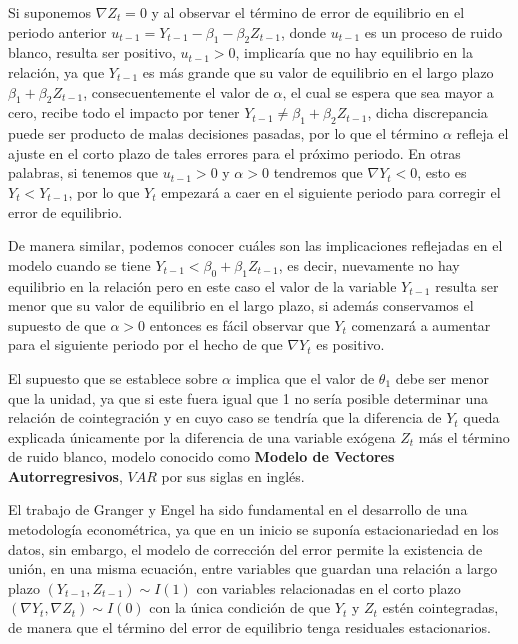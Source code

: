 Si suponemos $ \nabla Z_t =0$  y al observar el término de error de equilibrio en el periodo anterior $u_{t-1}=Y_{t-1} - \beta_1  -\beta_2 Z_{t-1} $, donde $u_{t-1}$ es un proceso de ruido blanco, resulta ser positivo, $  u_{t-1}> 0$, implicaría  que no hay equilibrio en la relación, ya que $Y_{t-1}$ es más grande que su valor de equilibrio en el largo plazo $ \beta_1  + \beta_2 Z_{t-1}$, consecuentemente el valor de  $\alpha$, el cual se espera que sea mayor a cero, recibe todo el impacto por tener   $Y_{t-1} \neq  \beta_1  + \beta_2 Z_{t-1}$, dicha discrepancia puede ser producto de malas decisiones pasadas, por lo que el término $\alpha$ refleja el ajuste en el corto plazo de tales errores para el próximo periodo. En otras palabras, si tenemos que $u_{t-1}>0$ y $\alpha>0$   tendremos que $\nabla Y_t <0$, esto es $Y_t < Y_{t-1}$, por lo que $Y_t$ empezará a caer en el siguiente periodo para corregir el error de equilibrio.    \bigskip
 
De manera similar, podemos conocer cuáles son las implicaciones reflejadas en el modelo cuando se tiene  $Y_{t-1}< \beta_0 + \beta_1 Z_{t-1}$, es decir, nuevamente no hay equilibrio en la relación pero en este caso el valor de la variable $Y_{t-1}$ resulta ser menor que su valor de equilibrio en el largo plazo, si además conservamos el supuesto de que $\alpha >0$ entonces es fácil observar que $Y_{t}$ comenzará a aumentar para el siguiente periodo por el hecho de que $\nabla Y_t$ es positivo.\bigskip

El supuesto que se establece sobre $\alpha$ implica que el valor de $\theta_1$ debe ser menor que la unidad, ya que si este fuera igual que 1 no sería posible determinar una   relación de cointegración   y en cuyo caso se tendría que la diferencia de $Y_t$ queda explicada únicamente por la diferencia de una  variable exógena $Z_t$ más el término de ruido blanco, modelo conocido como \textbf{Modelo de Vectores Autorregresivos}, $VAR$ por sus siglas en inglés. \bigskip


El trabajo de Granger y Engel ha sido fundamental en el desarrollo de una metodología econométrica, ya que en un inicio se suponía estacionariedad en los datos, sin embargo, el modelo de corrección del error permite la existencia de unión, en una misma ecuación,  entre variables que guardan una relación a largo plazo $(Y_{t-1},Z_{t-1}) \sim I(1)$ con variables relacionadas en el corto plazo $(\nabla Y_t, \nabla Z_t) \sim I(0)$ con la única condición de que $Y_t$ y $Z_t$ estén cointegradas, de manera que el término del error de equilibrio tenga residuales estacionarios. \bigskip

